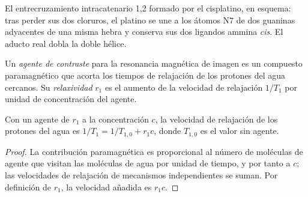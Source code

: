 \begin{omfigure}

{\small El entrecruzamiento intracatenario 1,2 formado por el cisplatino, en esquema: tras
perder sus dos cloruros, el platino se une a los átomos N7 de dos guaninas adyacentes
de una misma hebra y conserva sus dos ligandos ammina \textit{cis}. El aducto real
dobla la doble hélice.}
\end{omfigure}

\begin{definition}\label{def:b3:bioinorganic:contrast}
Un \emph{agente de contraste} para la resonancia magnética de imagen es
un compuesto paramagnético que acorta los tiempos de relajación de los protones del agua
cercanos. Su \emph{relaxividad} $r_1$ es el aumento de la
velocidad de relajación $1/T_1$ por unidad de concentración del agente.
\end{definition}

\begin{proposition}\label{prop:b3:bioinorganic:relaxivity}
Con un agente de  $r_1$ a la concentración $c$, la velocidad de relajación de los protones
del agua es $1/T_1 = 1/T_{1,0} + r_1c$, donde $T_{1,0}$ es el valor sin agente.
\end{proposition}

\begin{proof}
La contribución paramagnética es proporcional al número de moléculas de agente
que visitan las moléculas de agua por unidad de tiempo, y por tanto a $c$; las velocidades de relajación de
mecanismos independientes se suman. Por definición de $r_1$, la velocidad añadida es $r_1c$.
\end{proof}


